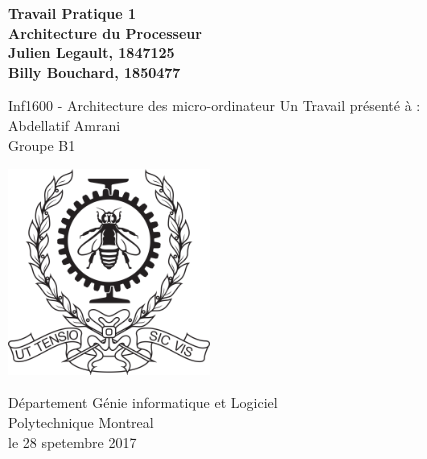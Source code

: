 \documentclass{article}
\begin{document}
\begin{titlepage}
	\begin{center}
		\Huge
		\textbf{Travail Pratique 1}\\
		\textbf{Architecture du Processeur}\\

		\vspace{2.0cm}
		\Large
		\textbf{Julien Legault, 1847125} \\
		\textbf{Billy Bouchard, 1850477}

		\vspace{2.0cm}
		Inf1600 - Architecture des micro-ordinateur
		\vfill
		Un Travail pr\'esent\'e \`a :\\
		Abdellatif Amrani \\
		\vspace{1.0cm}
		Groupe B1

		\vspace{0.8cm}

		\includegraphics[width=0.4\textwidth]{university.png}

		\Large
		D\'epartement G\'enie informatique et Logiciel\\
		Polytechnique Montreal\\
		le 28 spetembre 2017\\

	\end{center}
\end{titlepage}
\end{document}
